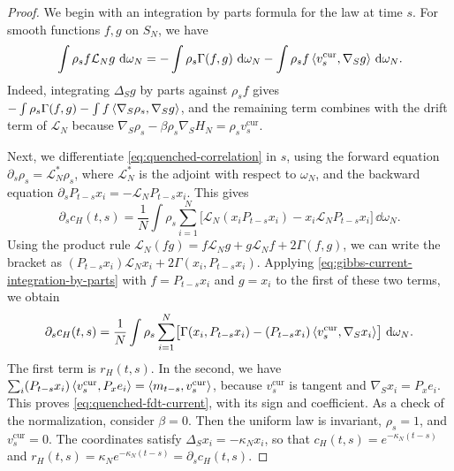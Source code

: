 \begin{proof}
We begin with an integration by parts formula for the law at time $s$. For smooth functions $f,g$ on $S_N$, we have
\begin{equation}
 \int\rho_sf\mathcal L_Ng\,\mathop{}\!\mathrm d\omega_N
 =-\int\rho_s\Gamma(f,g)\,\mathop{}\!\mathrm d\omega_N
 -\int\rho_sf\left\langle v^{\mathrm{cur}}_s,\nabla_Sg\right\rangle\,\mathop{}\!\mathrm d\omega_N.
 \label{eq:gibbs-current-integration-by-parts}
\end{equation}
Indeed, integrating $\Delta_Sg$ by parts against $\rho_sf$ gives $-\int\rho_s\Gamma(f,g)-\int f\left\langle\nabla_S\rho_s,\nabla_Sg\right\rangle$, and the remaining term combines with the drift term of $\mathcal L_N$ because $\nabla_S\rho_s-\beta\rho_s\nabla_SH_N=\rho_sv^{\mathrm{cur}}_s$.

Next, we differentiate \eqref{eq:quenched-correlation} in $s$, using the forward equation $\partial_s\rho_s=\mathcal L_N^*\rho_s$, where $\mathcal L_N^*$ is the adjoint with respect to $\omega_N$, and the backward equation $\partial_sP_{t-s}x_i=-\mathcal L_NP_{t-s}x_i$. This gives
\[
 \partial_sc_H(t,s)=\frac1N\int\rho_s\sum_{i=1}^N\bigl[\mathcal L_N(x_iP_{t-s}x_i)-x_i\mathcal L_NP_{t-s}x_i\bigr]\,\dd\omega_N.
\]
Using the product rule $\mathcal L_N(fg)=f\mathcal L_Ng+g\mathcal L_Nf+2\Gamma(f,g)$, we can write the bracket as $(P_{t-s}x_i)\mathcal L_Nx_i+2\Gamma(x_i,P_{t-s}x_i)$. Applying \eqref{eq:gibbs-current-integration-by-parts} with $f=P_{t-s}x_i$ and $g=x_i$ to the first of these two terms, we obtain
\[
 \partial_sc_H(t,s)=\frac1N\int\rho_s\sum_{i=1}^N\bigl[\Gamma(x_i,P_{t-s}x_i)-(P_{t-s}x_i)\left\langle v^{\mathrm{cur}}_s,\nabla_Sx_i\right\rangle\bigr]\,\mathop{}\!\mathrm d\omega_N.
\]
The first term is $r_H(t,s)$. In the second, we have $\sum_i(P_{t-s}x_i)\left\langle v^{\mathrm{cur}}_s,P_xe_i\right\rangle=\left\langle m_{t-s},v^{\mathrm{cur}}_s\right\rangle$, because $v^{\mathrm{cur}}_s$ is tangent and $\nabla_Sx_i=P_xe_i$. This proves \eqref{eq:quenched-fdt-current}, with its sign and coefficient. As a check of the normalization, consider $\beta=0$. Then the uniform law is invariant, $\rho_s=1$, and $v^{\mathrm{cur}}_s=0$. The coordinates satisfy $\Delta_Sx_i=-\kappa_Nx_i$, so that $c_H(t,s)=e^{-\kappa_N(t-s)}$ and $r_H(t,s)=\kappa_Ne^{-\kappa_N(t-s)}=\partial_sc_H(t,s)$.


\end{proof}
